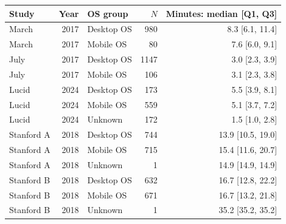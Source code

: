 \begin{tabular}{lrlrr}
\toprule
Study & Year & OS group & $N$ & Minutes: median [Q1, Q3] \\
\midrule
March & 2017 & Desktop OS &  980 & 8.3 [6.1, 11.4] \\
March & 2017 & Mobile OS &   80 & 7.6 [6.0, 9.1] \\
July & 2017 & Desktop OS & 1147 & 3.0 [2.3, 3.9] \\
July & 2017 & Mobile OS &  106 & 3.1 [2.3, 3.8] \\
Lucid & 2024 & Desktop OS &  173 & 5.5 [3.9, 8.1] \\
Lucid & 2024 & Mobile OS &  559 & 5.1 [3.7, 7.2] \\
Lucid & 2024 & Unknown &  172 & 1.5 [1.0, 2.8] \\
Stanford A & 2018 & Desktop OS &  744 & 13.9 [10.5, 19.0] \\
Stanford A & 2018 & Mobile OS &  715 & 15.4 [11.6, 20.7] \\
Stanford A & 2018 & Unknown &    1 & 14.9 [14.9, 14.9] \\
Stanford B & 2018 & Desktop OS &  632 & 16.7 [12.8, 22.2] \\
Stanford B & 2018 & Mobile OS &  671 & 16.7 [13.2, 21.8] \\
Stanford B & 2018 & Unknown &    1 & 35.2 [35.2, 35.2] \\
\bottomrule
\end{tabular}
